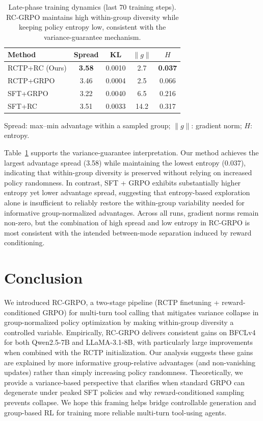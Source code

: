 \documentclass{article}
\theoremstyle{plain}
\theoremstyle{definition}
\theoremstyle{remark}
\begin{document}
\begin{table}[t]
\centering
\caption{Late-phase training dynamics (last 70 training steps). RC-GRPO maintains high within-group diversity while keeping policy entropy low, consistent with the variance-guarantee mechanism.}
\label{tab:q4_dynamics}
\scriptsize
\setlength{\tabcolsep}{2pt}
\renewcommand{\arraystretch}{1.05}
\begin{tabular*}{\columnwidth}{@{\extracolsep{\fill}}lcccc}
\toprule
\textbf{Method} & \textbf{Spread} & \textbf{KL} & \textbf{$\|g\|$} & \textbf{$H$} \\
\midrule
\rowcolor{blue!10}
RCTP+RC (Ours) & \textbf{3.58} & 0.0010 & 2.7 & \textbf{0.037} \\
RCTP+GRPO & 3.46 & 0.0004 & 2.5 & 0.066 \\
SFT+GRPO & 3.22 & 0.0040 & 6.5 & 0.216 \\
SFT+RC & 3.51 & 0.0033 & 14.2 & 0.317 \\
\bottomrule
\end{tabular*}
\vspace{0.2em}

\footnotesize{Spread: max--min advantage within a sampled group; $\|g\|$: gradient norm; $H$: entropy.}
\end{table}

Table~\ref{tab:q4_dynamics} supports the variance-guarantee interpretation. Our method achieves the largest advantage spread (3.58) while maintaining the lowest entropy (0.037), indicating that within-group diversity is preserved without relying on increased policy randomness. In contrast, SFT + GRPO exhibits substantially higher entropy yet lower advantage spread, suggesting that entropy-based exploration alone is insufficient to reliably restore the within-group variability needed for informative group-normalized advantages.
Across all runs, gradient norms remain non-zero, but the combination of high spread and low entropy in RC-GRPO is most consistent with the intended between-mode separation induced by reward conditioning.

\section{Conclusion}
We introduced RC-GRPO, a two-stage pipeline (RCTP finetuning + reward-conditioned GRPO) for multi-turn tool calling that mitigates variance collapse in group-normalized policy optimization by making within-group diversity a controlled variable. Empirically, RC-GRPO delivers consistent gains on BFCLv4 for both Qwen2.5-7B and LLaMA-3.1-8B, with particularly large improvements when combined with the RCTP initialization. Our analysis suggests these gains are explained by more informative group-relative advantages (and non-vanishing updates) rather than simply increasing policy randomness. Theoretically, we provide a variance-based perspective that clarifies when standard GRPO can degenerate under peaked SFT policies and why reward-conditioned sampling prevents collapse. We hope this framing helps bridge controllable generation and group-based RL for training more reliable multi-turn tool-using agents.
\end{document}
